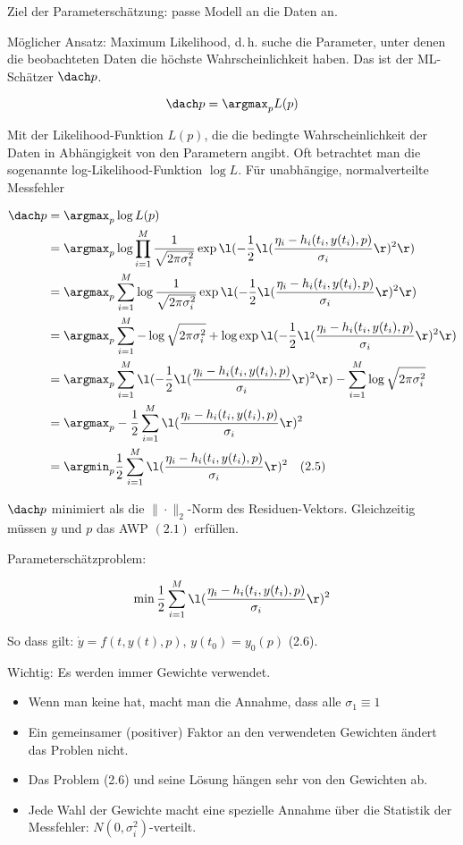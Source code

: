 Ziel der Parameterschätzung: passe Modell an die Daten an.

Möglicher Ansatz: Maximum Likelihood, d.\,h. suche die Parameter, unter denen die beobachteten Daten die höchste Wahrscheinlichkeit haben. Das ist der ML-Schätzer $\dach p$.

\[\dach p = \argmax_p L(p)\]

Mit der Likelihood-Funktion $L(p)$, die die bedingte Wahrscheinlichkeit der Daten in Abhängigkeit von den Parametern angibt. Oft betrachtet man die sogenannte log-Likelihood-Funktion $\log L$. Für unabhängige, normalverteilte Messfehler

\begin{align*}
\dach p &= \argmax_p \log L(p)\\
&= \argmax_p \log \prod_{i=1}^M \frac 1{\sqrt{2\pi \sigma_i^2}} \exp\l( -\frac 12 \l(\frac{\eta_i-h_i(t_i,y(t_i),p)}{\sigma_i} \r)^2 \r) \\
&= \argmax_p \sum_{i=1}^M \log \frac 1{\sqrt{2\pi \sigma_i^2}} \exp\l( -\frac 12 \l(\frac{\eta_i-h_i(t_i,y(t_i),p)}{\sigma_i} \r)^2 \r) \\
&= \argmax_p \sum_{i=1}^M -\log \sqrt{2\pi \sigma_i^2} + \log \exp\l( -\frac 12 \l(\frac{\eta_i-h_i(t_i,y(t_i),p)}{\sigma_i} \r)^2 \r) \\
&= \argmax_p \sum_{i=1}^M \l( -\frac 12 \l(\frac{\eta_i-h_i(t_i,y(t_i),p)}{\sigma_i} \r)^2 \r) - \sum_{i=1}^M \log \sqrt{2\pi \sigma_i^2} \\
&= \argmax_p - \frac 12 \sum_{i=1}^M \l(\frac{\eta_i-h_i(t_i,y(t_i),p)}{\sigma_i} \r)^2 \\
&= \argmin_p \frac 12 \sum_{i=1}^M \l(\frac{\eta_i-h_i(t_i,y(t_i),p)}{\sigma_i} \r)^2 \quad (2.5)\\
\end{align*}

$\dach p$ minimiert als die $\|\cdot\|_2$-Norm des Residuen-Vektors. Gleichzeitig müssen $y$ und $p$ das AWP $(2.1)$ erfüllen.

Parameterschätzproblem:

\[\min \frac 12 \sum_{i=1}^M \l(\frac{\eta_i - h_i(t_i,y(t_i),p)}{\sigma_i}\r)^2\]

So dass gilt: $\dot y = f(t,y(t),p)$, $y(t_0) = y_0(p)$ (2.6).

Wichtig: Es werden immer Gewichte verwendet.

\begin{itemize}
\item Wenn man keine hat, macht man die Annahme, dass alle $\sigma_1 \equiv 1$
\item Ein gemeinsamer (positiver) Faktor an den verwendeten Gewichten ändert das Problen nicht.
\item Das Problem (2.6) und seine Lösung hängen sehr von den Gewichten ab.
\item Jede Wahl der Gewichte macht eine spezielle Annahme über die Statistik der Messfehler: $N(0,\sigma_i^2)$-verteilt.
\end{itemize}

